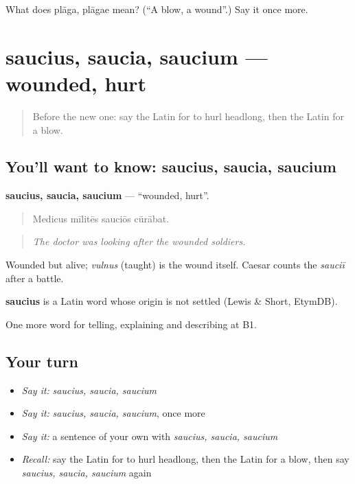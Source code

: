 \begin{tcolorbox}[breakable,colback=teal!4,colframe=teal!35!black,title={Before you move on}]
What does plāga, plāgae mean? (\textquotedblleft{}A blow, a wound\textquotedblright{}.) Say it once more.
\end{tcolorbox}
\section[saucius, saucia, saucium]{saucius, saucia, saucium — wounded, hurt}

\label{lesson:LA-C314-saucius}



\begin{quote}
Before the new one: say the Latin for to hurl headlong, then the Latin for a blow.
\end{quote}

\subsection*{You'll want to know: saucius, saucia, saucium}
\textbf{saucius, saucia, saucium} — \textquotedblleft{}wounded, hurt\textquotedblright{}.

\begin{quote}
Medicus mīlitēs sauciōs cūrābat.
\end{quote}

\begin{quote}
\emph{The doctor was looking after the wounded soldiers.}
\end{quote}

Wounded but alive; \emph{vulnus} (taught) is the wound itself. Caesar counts the \emph{sauciī} after a battle.

\begin{cousinweb}
\textbf{saucius} is a Latin word whose origin is not settled (Lewis \& Short, EtymDB).
\end{cousinweb}

\begin{grammarlens}[title={What you've built}]
One more word for telling, explaining and describing at B1.
\end{grammarlens}

\subsection*{Your turn}
\begin{itemize}
\raggedright
  \item \emph{Say it:} \emph{saucius, saucia, saucium}
  \item \emph{Say it:} \emph{saucius, saucia, saucium}, once more
  \item \emph{Say it:} a sentence of your own with \emph{saucius, saucia, saucium}
  \item \emph{Recall:} say the Latin for to hurl headlong, then the Latin for a blow, then say \emph{saucius, saucia, saucium} again
\end{itemize}

